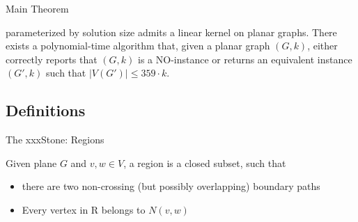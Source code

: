 \begin{frame}[c]{Main Theorem}
\begin{tcolorbox}[colback=TUMBlueLighter,title=The Main Theorem]
    \sdom parameterized by solution size admits a linear kernel on planar graphs.
    There exists a polynomial-time algorithm that, given a planar graph $(G, k)$, either correctly reports that $(G, k)$ is a NO-instance or returns an equivalent instance $(G', k)$ such that $|V(G')| \leq 359 \cdot k$.
\end{tcolorbox}
\end{frame}



\subsection{Definitions}
\begin{frame}[c]{The xxxStone: Regions}

    \begin{tcolorbox}[colback=TUMBlueLighter,title=Region (Simplified)]
        Given plane $G$ and $v,w \in V$, a region is a closed subset, such that
        \begin{itemize}
            \item there are two non-crossing (but possibly overlapping) boundary paths
            \item Every vertex in R belongs to $N(v,w)$
        \end{itemize}
    \end{tcolorbox}

        \begin{figure}[!ht]
        \end{figure}

\end{frame}

